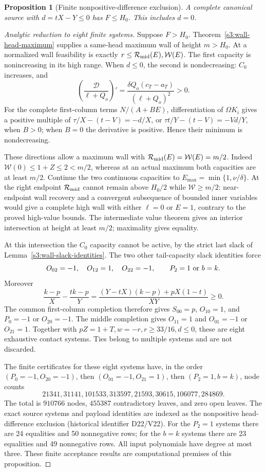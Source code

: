 \documentclass[11pt,reqno]{amsart}
\newtheorem{proposition}[theorem]{Proposition}
\theoremstyle{definition}
\theoremstyle{remark}
\begin{document}
\begin{proposition}[Finite nonpositive-difference exclusion]
\label{s3:wall-d-finite}
A complete canonical source with \(d=tX-Y\le0\) has
\(F\le H_0\). This includes \(d=0\).
\end{proposition}
\begin{proof}[Analytic reduction to eight finite systems]
Suppose \(F>H_0\). Theorem~\ref{s3:wall-head-maximum} supplies
a same-head maximum wall of height \(m>H_0\).
At a normalized wall feasibility is exactly
\(r\le\mathcal R_{\rm mid}(E),\mathcal W(E)\).
The first capacity is nonincreasing in its high range.
When \(d\le0\), the second is nondecreasing: \(C_0\) increases,
and
\[
 \left(\frac{\mathcal D}{\ell+Q_o}\right)'
   =\frac{\delta Q_o(c_T-a_T)}{(\ell+Q_o)^2}>0.
\]
For the complete first-column terms \(N/(A+BE)\), differentiation
of \(\Omega K_i\) gives a positive multiple of
\(\tau/X-(t-V)=-d/X\), or
\(\tau t/Y-(t-V)=-Vd/Y\), when \(B>0\); when \(B=0\)
the derivative is positive. Hence their minimum is nondecreasing.

These directions allow a maximum wall with
\(\mathcal R_{\rm mid}(E)=\mathcal W(E)=m/2\).
Indeed \(\mathcal W(0)\le1+Z\le2<m/2\), whereas at an
actual maximum both capacities are at least \(m/2\).
Continue the two continuous capacities to
\(E_{\max}=\min\{1,\nu/\delta\}\).
At the right endpoint \(\mathcal R_{\rm mid}\) cannot remain
above \(H_0/2\) while \(\mathcal W\ge m/2\): near-endpoint
wall recovery and a convergent subsequence of bounded inner variables
would give a complete high wall with either \(\ell=0\) or
\(E=1\), contrary to the proved high-value bounds.
The intermediate value theorem gives an interior intersection at
height at least \(m/2\); maximality gives equality.

At this intersection the \(C_0\) capacity cannot be active, by the
strict last slack of Lemma~\ref{s3:wall-slack-identities}.
The two other tail-capacity slack identities force
\[
 O_{02}=-1,\quad O_{12}=1,\quad O_{22}=-1,\qquad
 P_2=1\ \hbox{or}\ b=k.
\]
Moreover
\[
 \frac{k-p}{X}-\frac{tk-p}{Y}
 =\frac{(Y-tX)(k-p)+pX(1-t)}{XY}\ge0.
\]
The common first-column completion therefore gives
\(S_{00}=p\), \(O_{10}=1\), and
\(P_0=-1\) or \(O_{20}=-1\).
The middle completion gives \(O_{11}=1\) and
\(O_{01}=-1\) or \(O_{21}=1\). Together with
\(pZ=1+T,w=-r,r\ge33/16,d\le0\), these are eight
exhaustive contact systems. Ties belong to multiple systems and are
not discarded.

The finite certificates for these eight systems have, in the order
\((P_0=-1,O_{20}=-1)\), then \((O_{01}=-1,O_{21}=1)\),
then \((P_2=1,b=k)\), node counts
\[
 21341, 31141, 101533, 313597,
 21593, 30615, 106077, 284869.
\]
The total is \(910766\) nodes, \(455387\) contradictory leaves,
and zero open leaves. The exact source systems and payload identities
are indexed as the nonpositive head-difference exclusion
(historical identifier D22/V22). For the \(P_2=1\) systems there
are 24 equalities and 50 nonnegative rows; for the \(b=k\)
systems there are 23 equalities and 49 nonnegative rows. All input
polynomials have degree at most three. These finite acceptance
results are computational premises of this proposition.


\end{proof}
\end{document}
